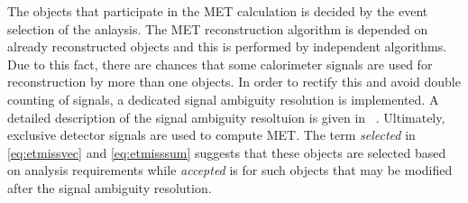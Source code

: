 The objects that participate in the MET calculation is decided by the event selection of the anlaysis. The MET reconstruction algorithm is depended on already reconstructed
objects and this is performed by independent algorithms. Due to this fact, there are chances that some calorimeter signals are used for reconstruction by more than one
objects. In order to rectify this and avoid double counting of signals, a dedicated signal ambiguity resolution is implemented. 
A detailed description of the signal ambiguity resoltuion is given in ~\cite{ATLAS:2024cmj}.
Ultimately, exclusive detector signals are used to compute MET. The term \textit{selected} in \cref{eq:etmissvec} and \cref{eq:etmisssum} suggests 
that these objects are selected based on analysis requirements while \textit{accepted} 
is for such objects that may be modified after the signal ambiguity resolution. 




